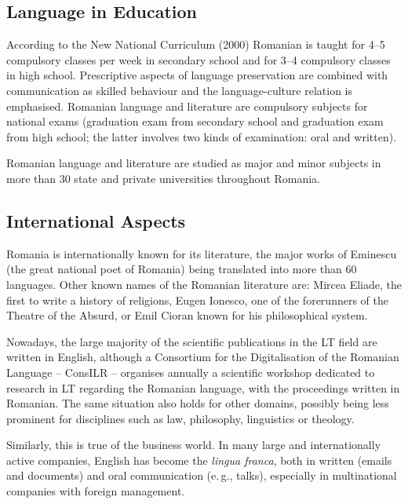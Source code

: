 \begin{multicols}{2}
\subsection{Language in Education}

According to the New National Curriculum (2000) Romanian is taught for 4--5 compulsory classes per week in secondary school and for 3--4 compulsory classes in high school. Prescriptive aspects of language preservation are combined with communication as skilled behaviour and the language-culture relation is emphasised. Romanian language and literature are compulsory subjects for national exams (graduation exam from secondary school and graduation exam from high school; the latter involves two kinds of examination: oral and written).

Romanian language and literature are studied as major and minor subjects in more than 30 state and private universities throughout Romania.

\subsection{International Aspects}

Romania is internationally known for its literature, the major works of Eminescu (the great national poet of Romania) being translated into more than 60 languages. Other known names of the Romanian literature are: Mircea Eliade, the first to write a history of religions, Eugen Ionesco, one of the forerunners of the Theatre of the Absurd, or Emil Cioran known for his philosophical system. 

Nowadays, the large majority of the scientific publications in the LT field are written in English, although a Consortium for the Digitalisation of the Romanian Language -- ConsILR -- organises annually a scientific workshop dedicated to research in LT regarding the Romanian language, with the proceedings written in Romanian. The same situation also holds for other domains, possibly being less prominent for disciplines such as law, philosophy, linguistics or theology. 

Similarly, this is true of the business world. In many large and internationally active companies, English has become the \textit{lingua franca}, both in written (emails and documents) and oral communication (e.\,g., talks), especially in multinational companies with foreign management.



\end{multicols}
